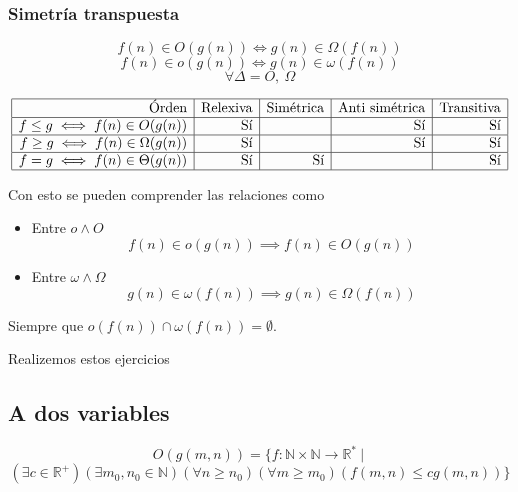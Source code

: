 \documentclass[tikz,11pt,fleqn]{book} %
\begin{document}
\subsubsection{Simetría transpuesta}
$$
	f(n)\in O(g(n))
	\iff
	g(n)\in\Omega(f(n))
$$ $$
	f(n)\in o(g(n))
	\iff
	g(n)\in\omega(f(n)) $$ $$
	\forall\Delta= O,~\Omega
$$
\begin{theorem}
	$$\begin{array} {|r|r|r|r|r|}
			\hline \text{Órden}                    & \text{Relexiva} & \text{Simétrica} & \text{Anti simétrica} & \text{Transitiva} \\
			\hline f\le g\iff f(n)\in O(g(n))      & \text{Sí}       &                  & \text{Sí}             & \text{Sí}         \\
			\hline f\ge g\iff f(n)\in \Omega(g(n)) & \text{Sí}       &                  & \text{Sí}             & \text{Sí}         \\
			\hline f= g\iff f(n)\in \Theta(g(n))   & \text{Sí}       & \text{Sí}        &                       & \text{Sí}         \\
			\hline
		\end{array}$$

	Con esto se pueden comprender las relaciones como
	\begin{itemize}
		\item Entre $o\land O$
		      $$  f(n)\in o(g(n)) \implies f(n)\in O(g(n))  $$
		\item Entre $\omega\land\Omega$
		      $$  g(n)\in \omega(f(n)) \implies g(n)\in \Omega(f(n))  $$
	\end{itemize}
	Siempre que $o(f(n))\cap \omega(f(n))=\emptyset$.
\end{theorem}

\begin{example}
	Realizemos estos ejercicios
\end{example}

\subsection{A dos variables}
\begin{definition}
	$$O(g(m,n))=\{f:\mathbb N\times \mathbb N\to \mathbb R^*~|~
	$$ $$
		(\exists c\in \mathbb R^+)
		(\exists  m_0 , n_0 \in \mathbb N)
		(\forall  n\ge  n_0)
		(\forall  m\ge  m_0)
		(f(m, n) \le  c g(m, n))
		\}
	$$
\end{definition}
\end{document}
